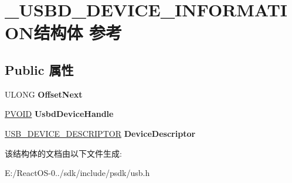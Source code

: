 \hypertarget{struct___u_s_b_d___d_e_v_i_c_e___i_n_f_o_r_m_a_t_i_o_n}{}\section{\+\_\+\+U\+S\+B\+D\+\_\+\+D\+E\+V\+I\+C\+E\+\_\+\+I\+N\+F\+O\+R\+M\+A\+T\+I\+O\+N结构体 参考}
\label{struct___u_s_b_d___d_e_v_i_c_e___i_n_f_o_r_m_a_t_i_o_n}
\subsection*{Public 属性}
\begin{DoxyCompactItemize}
\item 
\mbox{\label{struct___u_s_b_d___d_e_v_i_c_e___i_n_f_o_r_m_a_t_i_o_n_a86545e5a0a3a60d2ae1ddec9e9fc61d9}} 
U\+L\+O\+NG {\bfseries Offset\+Next}
\item 
\mbox{\label{struct___u_s_b_d___d_e_v_i_c_e___i_n_f_o_r_m_a_t_i_o_n_a64a263f83a480ed10bc33966e94f826f}} 
\hyperlink{interfacevoid}{P\+V\+O\+ID} {\bfseries Usbd\+Device\+Handle}
\item 
\mbox{\label{struct___u_s_b_d___d_e_v_i_c_e___i_n_f_o_r_m_a_t_i_o_n_aec85145da7c9fcddf55eba52657c2573}} 
\hyperlink{struct___u_s_b___d_e_v_i_c_e___d_e_s_c_r_i_p_t_o_r}{U\+S\+B\+\_\+\+D\+E\+V\+I\+C\+E\+\_\+\+D\+E\+S\+C\+R\+I\+P\+T\+OR} {\bfseries Device\+Descriptor}
\end{DoxyCompactItemize}


该结构体的文档由以下文件生成\+:\begin{DoxyCompactItemize}
\item 
E\+:/\+React\+O\+S-\/0../sdk/include/psdk/usb.\+h\end{DoxyCompactItemize}
